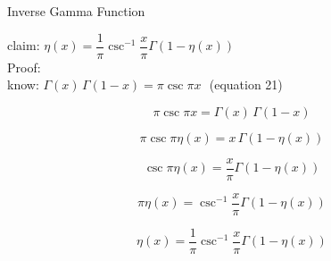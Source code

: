 \documentclass[12pt]{article}
\begin{document}
\pagebreak\begin{section}{Inverse Gamma Function}
	
	claim: $\eta(x)=\dfrac1\pi\csc^{-1}\dfrac x\pi\Gamma(1-\eta(x))$\\
	Proof:\\
	know: $\Gamma(x)\,\Gamma(1-x)=\pi\csc\pi x~~~$(equation 21)

	\begin{equation}\pi\csc\pi x=\Gamma(x)\,\Gamma(1-x)\end{equation}

	\begin{equation}\pi\csc\pi\eta(x)=x\,\Gamma(1-\eta(x))\end{equation}

	\begin{equation}\csc\pi\eta(x)=\dfrac x\pi\Gamma(1-\eta(x))\end{equation}

	\begin{equation}\pi\eta(x)=\csc^{-1}\dfrac x\pi\Gamma(1-\eta(x))\end{equation}

	\begin{equation}\eta(x)=\dfrac1\pi\csc^{-1}\dfrac x\pi\Gamma(1-\eta(x))\end{equation}

	\noindent\blacksquare


\end{section}
\end{document}
